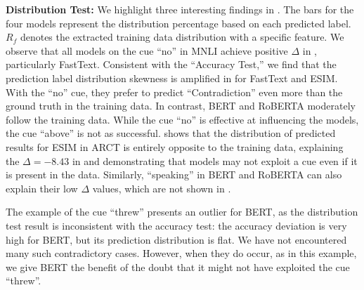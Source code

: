 \textbf{Distribution Test:} We highlight three interesting findings in . The bars for the four models represent the distribution percentage based on each predicted label. $R_f$ denotes the extracted training data distribution with a specific feature. We observe that all models on the cue ``no'' in MNLI achieve positive $\Delta$ in , particularly FastText. Consistent with the ``Accuracy Test,'' we find that the prediction label distribution skewness is amplified in  for FastText and ESIM. With the ``no'' cue, they prefer to predict ``Contradiction'' even more than the ground truth in the training data. In contrast, BERT and RoBERTA moderately follow the training data. While the cue ``no'' is effective at influencing the models, the cue ``above'' is not as successful.  shows that the distribution of predicted results for ESIM in ARCT is entirely opposite to the training data, explaining the $\Delta=-8.43$ in  and demonstrating that models may not exploit a cue even if it is present in the data. Similarly, ``speaking'' in BERT and RoBERTA can also explain their low $\Delta$ values, which are not shown in .

The example of the cue ``threw'' presents an outlier for BERT, as the distribution test result is inconsistent with the accuracy test: the accuracy deviation is very high for BERT, but its prediction distribution is flat. We have not encountered many such contradictory cases. However, when they do occur, as in this example, we give BERT the benefit of the doubt that it might not have exploited the cue ``threw''. 



